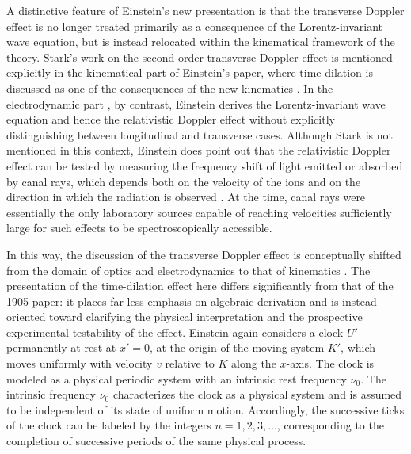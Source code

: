 \documentclass[pdflatex]{sn-jnl}
\begin{document}
A distinctive feature of Einstein’s new presentation is that the transverse Doppler effect is no longer treated primarily as a consequence of the Lorentz-invariant wave equation, but is instead relocated within the kinematical framework of the theory. Stark’s work on the second-order transverse Doppler effect is mentioned explicitly in the kinematical part  of Einstein’s paper, where time dilation is discussed as one of the consequences of the new kinematics \citep[422]{Einstein1908}. In the electrodynamic part , by contrast, Einstein derives the Lorentz-invariant wave equation and hence the relativistic Doppler effect without explicitly distinguishing between longitudinal and transverse cases. Although Stark is not mentioned in this context, Einstein does point out that the relativistic Doppler effect can be tested by measuring the frequency shift of light emitted or absorbed by canal rays, which depends both on the velocity of the ions and on the direction in which the radiation is observed \citep[425]{Einstein1907a}. At the time, canal rays were essentially the only laboratory sources capable of reaching velocities sufficiently large for such effects to be spectroscopically accessible.

In this way, the discussion of the transverse Doppler effect is conceptually shifted from the domain of optics and electrodynamics to that of kinematics \citep[421--22]{Einstein1908}. The presentation of the time-dilation effect here differs significantly from that of the 1905 paper: it places far less emphasis on algebraic derivation and is instead oriented toward clarifying the physical interpretation and the prospective experimental testability of the effect. Einstein again considers a clock $U'$ permanently at rest at $x'=0$, at the origin of the moving system $K'$, which moves uniformly with velocity $v$ relative to $K$ along the $x$-axis. The clock is modeled as a physical periodic system with an intrinsic rest frequency $\nu_0$. The intrinsic frequency $\nu_0$ characterizes the clock as a physical system and is assumed to be independent of its state of uniform motion. Accordingly, the successive ticks of the clock can be labeled by the integers $n=1,2,3,\ldots$, corresponding to the completion of successive periods of the same physical process.
\end{document}
